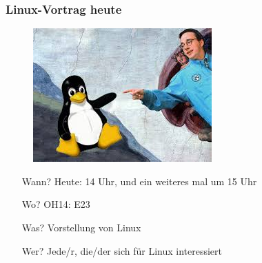 \documentclass{beamer}
\begin{document}
\begin{frame}
\frametitle{Linux-Vortrag heute}
\begin{figure}
\includegraphics[scale=0.7]{tuxlinus.jpeg}
\end{figure}
\begin{itemize}
		\item[Wann?] Heute: 14 Uhr, und ein weiteres mal um 15 Uhr
		\item[Wo?] OH14: E23
		\item[Was?] Vorstellung von Linux
		\item[Wer?] Jede/r, die/der sich für Linux interessiert
\end{itemize}
\end{frame}
\end{document}
